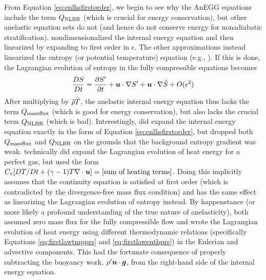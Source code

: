 \documentclass[12pt]{article}
\newcommand{\heatnlbr}{Q_{\rm NLBR}}
\newcommand{\heatmassflux}{Q_{\rm massflux}}
\begin{document}
From Equation \eqref{eq:enlhsfirstorder}, we begin to see why the AnEGG equations include the term $\heatnlbr$ (which is crucial for energy conservation), but other anelastic equation sets do not (and hence do not conserve energy for nonadiabatic stratification). \citet{Gough1969} nondimensionalized the internal energy equation and then linearized by expanding to first order in $\epsilon$. The other approximations instead linearized the entropy (or potential temperature) equation (e.g., \citealt{Batchelor1953,Ogura1962,Brown2012}). If this is done, the Lagrangian evolution of entropy in the fully compressible equations becomes
\begin{align}\label{eq:entrlhsfirstorder}
	\frac{DS}{Dt} =\frac{\partial{S^\prime}}{\partial t}  + \bm{u}\cdot\nabla {S^\prime} + \bm{u}\cdot\nabla \tilde{S} + O(\epsilon^2)
\end{align}
After multiplying by $\tilde{\rho}\tilde{T}$, the anelastic internal energy equation thus lacks the term $\heatmassflux$ (which is good for energy conservation), but also lacks the crucial term $\heatnlbr$ (which is bad). Interestingly, \citet{Gilman1981} did expand the internal energy equation exactly in the form of Equation \eqref{eq:enlhsfirstorder}, but dropped both $\heatmassflux$ and $\heatnlbr$ on the grounds that the background entropy gradient was weak. \citet{Rogers2005} technically did expand the Lagrangian evolution of heat energy for a perfect gas, but used the form $C_{\rm{v}} [DT/Dt + (\gamma-1)T\nabla\cdot\bm{u}]=\text{[sum of heating terms]}$. Doing this implicitly assumes that the continuity equation is satisfied at first order (which is contradicted by the divergence-free mass flux condition) and has the same effect as linearizing the Lagrangian evolution of entropy instead. By happenstance (or more likely a profound understanding of the true nature of anelasticity), \citet{Gough1969} both assumed zero mass flux for the fully compressible flow and wrote the Lagrangian evolution of heat energy using different thermodynamic relations (specifically Equations \eqref{eq:firstlawtmpprs} and \eqref{eq:firstlawenthprs}) in the Eulerian and advective components. This had the fortunate consequence of properly subtracting the buoyancy work, ${\rho^\prime} \bm{u}\cdot \bm{g}$, from the right-hand side of the internal energy equation. 
\end{document}
